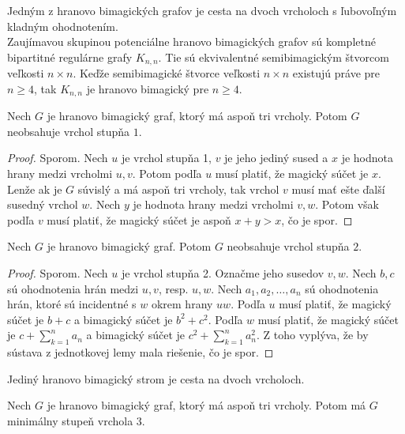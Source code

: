 Jedným z hranovo bimagických grafov je cesta na dvoch vrcholoch s ľubovoľným kladným ohodnotením. \\

Zaujímavou skupinou potenciálne hranovo bimagických grafov sú kompletné bipartitné regulárne grafy $K _{n,n}$. Tie sú ekvivalentné semibimagickým štvorcom veľkosti $n \times n$. Keďže semibimagické štvorce veľkosti $n \times n$ existujú práve pre $n \geq 4$, tak $K _{n,n}$ je hranovo bimagický pre $n \geq 4$.

\begin{theorem}
\label{hbgdegree1}
Nech $G$ je hranovo bimagický graf, ktorý má aspoň tri vrcholy. Potom $G$ neobsahuje vrchol stupňa $1$.
\end{theorem}

\begin{proof} Sporom. Nech $u$ je vrchol stupňa 1, $v$ je jeho jediný sused a $x$ je hodnota hrany medzi vrcholmi $u,v$. Potom podľa $u$ musí platiť, že magický súčet je $x$. Lenže ak je $G$ súvislý a má aspoň tri vrcholy, tak vrchol $v$ musí mať ešte ďalší susedný vrchol $w$. Nech $y$ je hodnota hrany medzi vrcholmi $v,w$. Potom však podľa $v$ musí platiť, že magický súčet je aspoň $x + y > x$, čo je spor.
\end{proof} 

\begin{theorem} Nech $G$ je hranovo bimagický graf. Potom $G$ neobsahuje vrchol stupňa $2$.
\end{theorem}

\begin{proof} Sporom. Nech $u$ je vrchol stupňa 2. Označme jeho susedov $v,w$. Nech $b,c$ sú ohodnotenia hrán medzi $u,v$, resp. $u,w$. Nech $a_1, a_2, \dots , a_n$ sú ohodnotenia hrán, ktoré sú incidentné s $w$ okrem hrany $uw$. Podľa $u$ musí platiť, že magický súčet je $b+c$ a bimagický súčet je $b^2 + c^2$. Podľa $w$ musí platiť, že magický súčet je $c + \sum_{k=1}^{n} a_n$ a bimagický súčet je $c^2 + \sum_{k=1}^{n} a^2_n$. Z toho vyplýva, že by sústava z jednotkovej lemy mala riešenie, čo je spor.
\end{proof}

\begin{consequence}
\label{hbgtree} 
Jediný hranovo bimagický strom je cesta na dvoch vrcholoch.
\end{consequence}

\begin{consequence}
\label{hbgdegree3} 
Nech $G$ je hranovo bimagický graf, ktorý má aspoň tri vrcholy. Potom má $G$ minimálny stupeň vrchola $3$.
\end{consequence}

